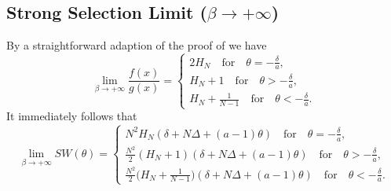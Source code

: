 \documentclass{article}
\begin{document}
\subsection*{Strong Selection Limit ($\beta \to +\infty$)}
By a straightforward adaption of the proof of \cite[Proposition 1.12]{duonghan2021cost} we have
\begin{equation*}
    \lim_{\beta \to +\infty}\frac{f(x)}{g(x)}=\begin{cases}
      2 H_N\quad\text{for}\quad \theta=-\frac{\delta}{a},\\
      H_N+1\quad\text{for}\quad \theta>-\frac{\delta}{a},\\
      H_N+\frac{1}{N-1}\quad\text{for}\quad \theta<-\frac{\delta}{a}.
    \end{cases}    
    \end{equation*}
It immediately follows that
\begin{equation*}
    \lim_{\beta \to +\infty}SW(\theta)=\begin{cases}
      N^2 H_N (\delta+N\Delta+(a-1)\theta)\quad\text{for}\quad \theta=-\frac{\delta}{a},\\
      \frac{N^2}{2}(H_N+1)(\delta+N\Delta+(a-1)\theta)\quad\text{for}\quad \theta>-\frac{\delta}{a},\\
      \frac{N^2}{2}\Big(H_N+\frac{1}{N-1}\Big) (\delta+N\Delta+(a-1)\theta)\quad\text{for}\quad \theta<-\frac{\delta}{a}.
    \end{cases}    
    \end{equation*}

\end{document}
